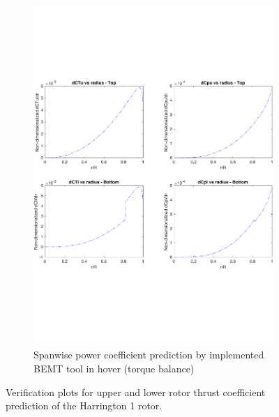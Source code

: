 \begin{figure}
\begin{subfigure}[t]{0.5\textwidth}
    \includegraphics[width=\textwidth]{Figures/CT_plot.pdf}
    \caption{Spanwise power coefficient prediction by implemented BEMT tool in hover (torque balance)}
\end{subfigure}
    \captionsetup{justification=centering}
    \caption{Verification plots for upper and lower rotor thrust coefficient prediction of the Harrington 1 rotor.}
    \label{fig:verification_thrust}
\end{figure}

